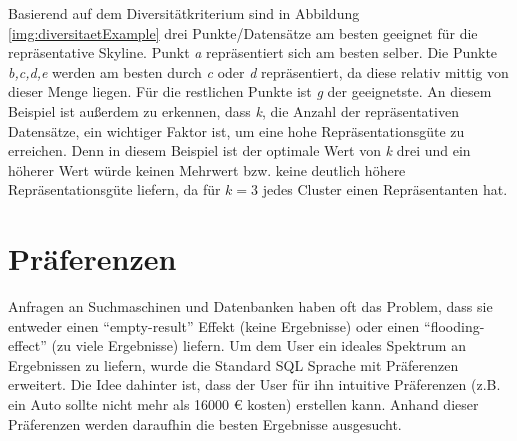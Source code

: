 {Basierend auf dem Diversitätkriterium sind in Abbildung \ref{img:diversitaetExample} drei Punkte/Datensätze am besten geeignet für die repräsentative Skyline. Punkt \textit{a} repräsentiert sich am besten selber. Die Punkte \textit{b,c,d,e} werden am besten durch \textit{c} oder \textit{d} repräsentiert, da diese relativ mittig von dieser Menge liegen. Für die restlichen Punkte ist \textit{g} der geeignetste.
An diesem Beispiel ist außerdem zu erkennen, dass \textit{k}, die Anzahl der repräsentativen Datensätze, ein wichtiger Faktor ist, um eine hohe Repräsentationsgüte zu erreichen. Denn in diesem Beispiel ist der optimale Wert von \textit{k} drei und ein höherer Wert würde keinen Mehrwert bzw. keine deutlich höhere Repräsentationsgüte liefern, da für $k=3$ jedes Cluster einen Repräsentanten hat.
\section{Präferenzen}
\label{ch:Grundlagen:sec:präferenzen}
Anfragen an Suchmaschinen und Datenbanken haben oft das Problem, dass sie entweder einen \enquote{empty-result} Effekt (keine Ergebnisse) oder einen \enquote{flooding-effect} (zu viele Ergebnisse) liefern. Um dem User ein ideales Spektrum an Ergebnissen zu liefern, wurde die Standard SQL Sprache mit Präferenzen erweitert. Die Idee dahinter ist, dass der User für ihn intuitive Präferenzen (z.B. ein Auto sollte nicht mehr als 16000 \euro{} kosten) erstellen kann. Anhand dieser Präferenzen werden daraufhin die besten Ergebnisse ausgesucht.

\begin{figure}[H]
\centering
{}
\end{figure}}
